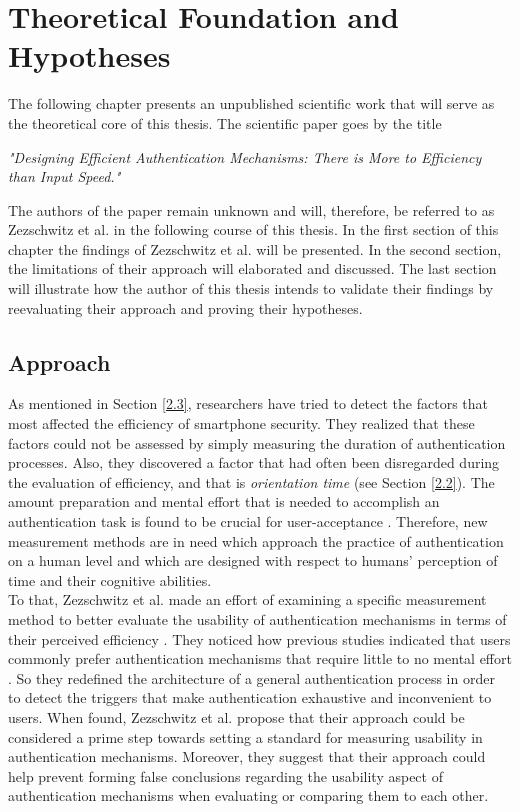 
\chapter{Theoretical Foundation and Hypotheses}\label{ch:third}


The following chapter presents an unpublished scientific work that will serve as the theoretical core of this thesis. The scientific paper goes by the title 
\begin{center}
 \textit{"Designing Efficient Authentication Mechanisms: There is More to Efficiency than Input Speed."}   
\end{center}
The authors of the paper remain unknown and will, therefore, be referred to as Zezschwitz et al. \cite{Zezschwitz} in the following course of this thesis. In the first section of this chapter the findings of Zezschwitz et al. \cite{Zezschwitz} will be presented. In the second section, the limitations of their approach will elaborated and discussed. The last section will illustrate how the author of this thesis intends to validate their findings by reevaluating their approach and proving their hypotheses.

\section{Approach}

As mentioned in Section \ref{2.3}, researchers have tried to detect the factors that most affected the efficiency of smartphone security. They realized that these factors could not be assessed by simply measuring the duration of authentication processes. Also, they discovered a factor that had often been disregarded during the evaluation of efficiency, and that is \textit{orientation time} (see Section \ref{2.2}). The amount preparation and mental effort that is needed to accomplish an authentication task is found to be crucial for user-acceptance \cite{Zezschwitz}. Therefore, new measurement methods are in need which approach the practice of authentication on a human level and which are designed with respect to humans' perception of time and their cognitive abilities. \\

To that, Zezschwitz et al. \cite{Zezschwitz} made an effort of examining a specific measurement method to better evaluate the usability of authentication mechanisms in terms of their perceived efficiency \cite{Zezschwitz}. They noticed how previous studies indicated that users commonly prefer authentication mechanisms that require little to no mental effort \cite{Zezschwitz, AnatomySmartphone}. So they redefined the architecture of a general authentication process in order to detect the triggers that make authentication exhaustive and inconvenient to users. When found, Zezschwitz et al. \cite{Zezschwitz} propose that their approach could be considered a prime step towards setting a standard for measuring usability in authentication mechanisms. Moreover, they suggest that their approach could help prevent forming false conclusions regarding the usability aspect of authentication mechanisms when evaluating or comparing them to each other.  \\

